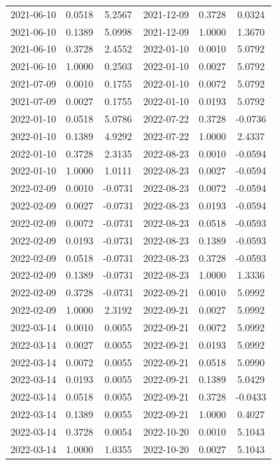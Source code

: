 \begin{footnotesize}
\begin{longtable}{lcc|lcc}
2021-06-10 & 0.0518 & 5.2567 & 2021-12-09 & 0.3728 & 0.0324 \\
2021-06-10 & 0.1389 & 5.0998 & 2021-12-09 & 1.0000 & 1.3670 \\
2021-06-10 & 0.3728 & 2.4552 & 2022-01-10 & 0.0010 & 5.0792 \\
2021-06-10 & 1.0000 & 0.2503 & 2022-01-10 & 0.0027 & 5.0792 \\
2021-07-09 & 0.0010 & 0.1755 & 2022-01-10 & 0.0072 & 5.0792 \\
2021-07-09 & 0.0027 & 0.1755 & 2022-01-10 & 0.0193 & 5.0792 \\
2022-01-10 & 0.0518 & 5.0786 & 2022-07-22 & 0.3728 & -0.0736 \\
2022-01-10 & 0.1389 & 4.9292 & 2022-07-22 & 1.0000 & 2.4337 \\
2022-01-10 & 0.3728 & 2.3135 & 2022-08-23 & 0.0010 & -0.0594 \\
2022-01-10 & 1.0000 & 1.0111 & 2022-08-23 & 0.0027 & -0.0594 \\
2022-02-09 & 0.0010 & -0.0731 & 2022-08-23 & 0.0072 & -0.0594 \\
2022-02-09 & 0.0027 & -0.0731 & 2022-08-23 & 0.0193 & -0.0594 \\
2022-02-09 & 0.0072 & -0.0731 & 2022-08-23 & 0.0518 & -0.0593 \\
2022-02-09 & 0.0193 & -0.0731 & 2022-08-23 & 0.1389 & -0.0593 \\
2022-02-09 & 0.0518 & -0.0731 & 2022-08-23 & 0.3728 & -0.0593 \\
2022-02-09 & 0.1389 & -0.0731 & 2022-08-23 & 1.0000 & 1.3336 \\
2022-02-09 & 0.3728 & -0.0731 & 2022-09-21 & 0.0010 & 5.0992 \\
2022-02-09 & 1.0000 & 2.3192 & 2022-09-21 & 0.0027 & 5.0992 \\
2022-03-14 & 0.0010 & 0.0055 & 2022-09-21 & 0.0072 & 5.0992 \\
2022-03-14 & 0.0027 & 0.0055 & 2022-09-21 & 0.0193 & 5.0992 \\
2022-03-14 & 0.0072 & 0.0055 & 2022-09-21 & 0.0518 & 5.0990 \\
2022-03-14 & 0.0193 & 0.0055 & 2022-09-21 & 0.1389 & 5.0429 \\
2022-03-14 & 0.0518 & 0.0055 & 2022-09-21 & 0.3728 & -0.0433 \\
2022-03-14 & 0.1389 & 0.0055 & 2022-09-21 & 1.0000 & 0.4027 \\
2022-03-14 & 0.3728 & 0.0054 & 2022-10-20 & 0.0010 & 5.1043 \\
2022-03-14 & 1.0000 & 1.0355 & 2022-10-20 & 0.0027 & 5.1043 \\

\end{longtable}
\end{footnotesize}
